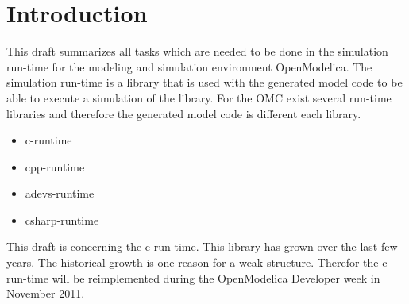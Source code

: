 
%
%

\section{Introduction}\label{sec:intro}

This draft summarizes all tasks which are needed to be done in the simulation
run-time for the modeling and simulation environment OpenModelica. The
simulation run-time is a library that is used with the generated model code to
be able to execute a simulation of the library. For the OMC exist several
run-time libraries and therefore the generated model code is different each
library.

\begin{itemize}
\item c-runtime
\item cpp-runtime
\item adevs-runtime 
\item csharp-runtime
\end{itemize}

This draft is concerning the c-run-time. This library has grown over the
last few years. The historical growth is one reason for a weak structure.
Therefor the c-run-time will be reimplemented during the OpenModelica Developer
week in November 2011.

